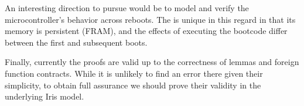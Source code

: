 An interesting direction to pursue would be to model and verify the microcontroller's behavior across reboots. The \msp is unique in this regard in that its memory is persistent (FRAM), and the effects of executing the bootcode differ between the first and subsequent boots.

Finally, currently the proofs are valid up to the correctness of lemmas and foreign function contracts. While it is unlikely to find an error there given their simplicity, to obtain full assurance we should prove their validity in the underlying Iris model. %
